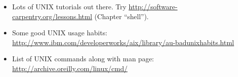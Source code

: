 \begin{itemize} \itemsep6pt
    \item Lots of UNIX tutorials out there. Try 
\url{http://software-carpentry.org/lessons.html} (Chapter ``shell'').
	\item Some good UNIX usage habits: \url{http://www.ibm.com/developerworks/aix/library/au-badunixhabits.html}
   \item List of UNIX commands along with man page: \url{http://archive.oreilly.com/linux/cmd/}
\end{itemize}
